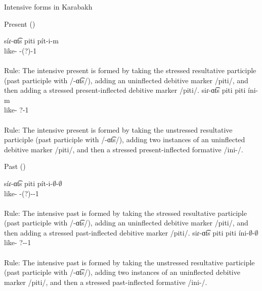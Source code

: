 \begin{exe}
	\ex Intensive forms in Karabakh \label{sent:Karabakh:morpho:verb:intensive}
	\begin{xlist}
		\ex Present  ()
		
		\begin{xlist}
			\ex  \gll 
			s\'iɾ-ɑt͡s piti p\'it-i-m \\ 
			like-{\rptcp} {\deb} {\deb}-{\thgloss}(?)-1{\sg} \\ 
			\trans {}\\
			Rule: The intensive present is formed by taking the stressed resultative participle (past participle with /-ɑt͡s/), adding an uninflected debitive marker /piti/, and then adding a stressed present-inflected debitive marker /piti/. 
			\ex  \gll 
			siɾ-ɑt͡s piti piti \'ini-m \\ 
			like-{\rptcp} {\deb} {\deb} {?}-1{\sg} \\ 
			\trans {}\\
			Rule: The intensive present is formed by taking the unstressed resultative participle (past participle with /-ɑt͡s/), adding two instances of an uninflected debitive marker /piti/, and then a stressed present-inflected formative /ini-/.
		\end{xlist}
\ex Past ()
\begin{xlist}
	\ex \gll 
	s\'iɾ-ɑt͡s piti p\'it-i-$\emptyset$-$\emptyset$ \\ 
	like-{\rptcp} {\deb} {\deb}-{\thgloss}(?)-{\pst}-1{\sg} \\ 
	\trans {}\\
	Rule: The intensive past is formed by taking the stressed resultative participle (past participle with /-ɑt͡s/), adding an uninflected debitive marker /piti/, and then adding a stressed past-inflected debitive marker /piti/. 
	\ex  \gll 
	siɾ-ɑt͡s piti piti \'ini-$\emptyset$-$\emptyset$ \\ 
	like-{\rptcp} {\deb} {\deb} {?}-{\pst}-1{\sg} \\ 
	\trans {} \\
	Rule: The intensive past is formed by taking the unstressed resultative participle (past participle with /-ɑt͡s/), adding two instances of an uninflected debitive marker /piti/, and then a stressed past-inflected formative /ini-/.
	

\end{xlist}
\end{xlist}
\end{exe}
